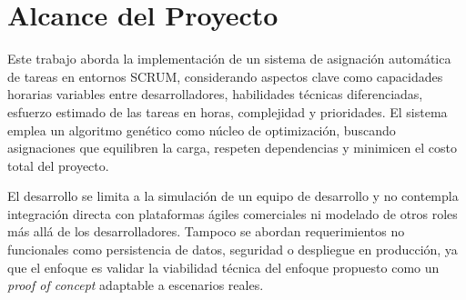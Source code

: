 \section{Alcance del Proyecto}

Este trabajo aborda la implementación de un sistema de asignación automática de tareas en entornos SCRUM, considerando aspectos clave como capacidades horarias variables entre desarrolladores, habilidades técnicas diferenciadas, esfuerzo estimado de las tareas en horas, complejidad y prioridades. El sistema emplea un algoritmo genético como núcleo de optimización, buscando asignaciones que equilibren la carga, respeten dependencias y minimicen el costo total del proyecto.

El desarrollo se limita a la simulación de un equipo de desarrollo y no contempla integración directa con plataformas ágiles comerciales ni modelado de otros roles más allá de los desarrolladores. Tampoco se abordan requerimientos no funcionales como persistencia de datos, seguridad o despliegue en producción, ya que el enfoque es validar la viabilidad técnica del enfoque propuesto como un \textit{proof of concept} adaptable a escenarios reales.



